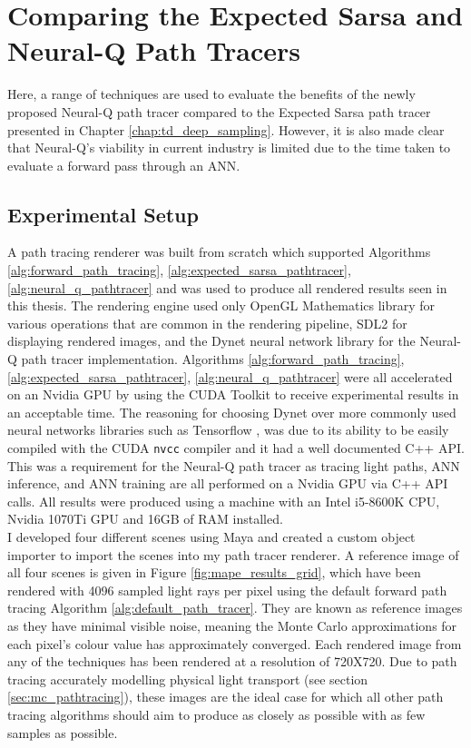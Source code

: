 \documentclass[../dissertation.tex]{subfiles}
\begin{document}
\chapter{Comparing the Expected Sarsa and Neural-Q  Path Tracers}

\label{chap:evaluation}

Here, a range of techniques are used to evaluate the benefits of the newly proposed Neural-Q path tracer compared to the Expected Sarsa path tracer presented in Chapter \ref{chap:td_deep_sampling}. However, it is also made clear that Neural-Q's viability in current industry is limited due to the time taken to evaluate a forward pass through an ANN.

\section{Experimental Setup}

A path tracing renderer was built from scratch which supported Algorithms \ref{alg:forward_path_tracing}, \ref{alg:expected_sarsa_pathtracer}, \ref{alg:neural_q_pathtracer} and was used to produce all rendered results seen in this thesis. The rendering engine used only OpenGL Mathematics library \cite{glm} for various operations that are common in the rendering pipeline, SDL2 \cite{sdl2} for displaying rendered images, and the Dynet neural network library \cite{dynet} for the Neural-Q path tracer implementation. Algorithms \ref{alg:forward_path_tracing}, \ref{alg:expected_sarsa_pathtracer}, \ref{alg:neural_q_pathtracer} were all accelerated on an Nvidia GPU by using the CUDA Toolkit \cite{cuda} to receive experimental results in an acceptable time. The reasoning for choosing Dynet over more commonly used neural networks libraries such as Tensorflow \cite{tensorflow2015-whitepaper}, was due to its ability to be easily compiled with the CUDA \verb|nvcc| compiler and it had a well documented C++ API. This was a requirement for the Neural-Q path tracer as tracing light paths, ANN inference, and ANN training are all performed on a Nvidia GPU via C++ API calls. All results were produced using a machine with an Intel i5-8600K CPU, Nvidia 1070Ti GPU and 16GB of RAM installed.\\

I developed four different scenes using Maya \cite{maya} and created a custom object importer to import the scenes into my path tracer renderer. A reference image of all four scenes is given in Figure \ref{fig:mape_results_grid}, which have been rendered with 4096 sampled light rays per pixel using the default forward path tracing Algorithm \ref{alg:default_path_tracer}. They are known as reference images as they have minimal visible noise, meaning the Monte Carlo approximations for each pixel's colour value has approximately converged. Each rendered image from any of the techniques has been rendered at a resolution of 720X720. Due to path tracing accurately modelling physical light transport (see section \ref{sec:mc_pathtracing}), these images are the ideal case for which all other path tracing algorithms should aim to produce as closely as possible with as few samples as possible. 
\end{document}
